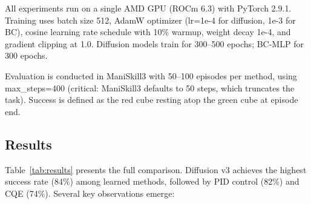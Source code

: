 \documentclass[twocolumn]{article}
\begin{document}
All experiments run on a single AMD GPU (ROCm 6.3) with PyTorch 2.9.1. Training uses batch size 512, AdamW optimizer (lr=1e-4 for diffusion, 1e-3 for BC), cosine learning rate schedule with 10\% warmup, weight decay 1e-4, and gradient clipping at 1.0. Diffusion models train for 300--500 epochs; BC-MLP for 300 epochs.

Evaluation is conducted in ManiSkill3 with 50--100 episodes per method, using max\_steps=400 (critical: ManiSkill3 defaults to 50 steps, which truncates the task). Success is defined as the red cube resting atop the green cube at episode end.

\subsection{Results}

Table~\ref{tab:results} presents the full comparison. Diffusion v3 achieves the highest success rate (84\%) among learned methods, followed by PID control (82\%) and CQE (74\%). Several key observations emerge:
\end{document}
